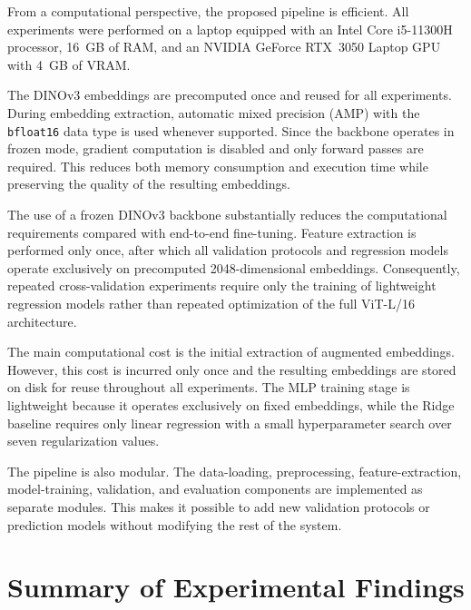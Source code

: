 From a computational perspective, the proposed pipeline is efficient. All experiments were performed on a laptop equipped with an Intel Core i5-11300H processor, 16~GB of RAM, and an NVIDIA GeForce RTX~3050 Laptop GPU with 4~GB of VRAM. 

The DINOv3 embeddings are precomputed once and reused for all experiments. During embedding extraction, automatic mixed precision (AMP) with the \texttt{bfloat16} data type is used whenever supported. Since the backbone operates in frozen mode, gradient computation is disabled and only forward passes are required. This reduces both memory consumption and execution time while preserving the quality of the resulting embeddings. 

The use of a frozen DINOv3 backbone substantially reduces the computational requirements compared with end-to-end fine-tuning. Feature extraction is performed only once, after which all validation protocols and regression models operate exclusively on precomputed 2048-dimensional embeddings. Consequently, repeated cross-validation experiments require only the training of lightweight regression models rather than repeated optimization of the full ViT-L/16 architecture. 

The main computational cost is the initial extraction of augmented embeddings. However, this cost is incurred only once and the resulting embeddings are stored on disk for reuse throughout all experiments. The MLP training stage is lightweight because it operates exclusively on fixed embeddings, while the Ridge baseline requires only linear regression with a small hyperparameter search over seven regularization values. 

The pipeline is also modular. The data-loading, preprocessing, feature-extraction, model-training, validation, and evaluation components are implemented as separate modules. This makes it possible to add new validation protocols or prediction models without modifying the rest of the system.

\section{Summary of Experimental Findings} 

